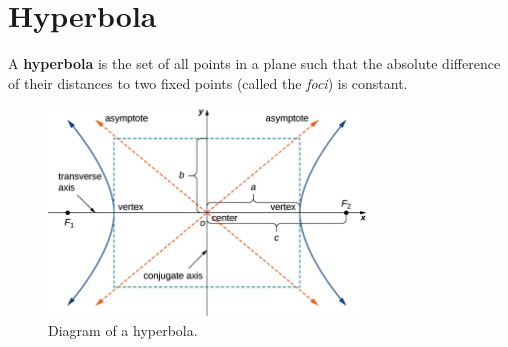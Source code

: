 \documentclass{article}
\begin{document}
\section*{Hyperbola}
\begin{definitionbox}  
A \textbf{hyperbola} is the set of all points in a plane such that the absolute difference of their distances to two fixed points (called the \textit{foci}) is constant.
\begin{figure}[H]
    \centering
    \includegraphics[width=0.75\textwidth]{hyperbola.jpg}
    \caption{Diagram of a hyperbola.}
\end{figure}
\end{definitionbox}
\end{document}
